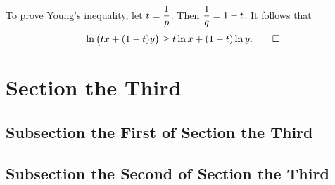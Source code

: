To prove Young's inequality, let \(\displaystyle t = \frac{1}{p}\). Then \(\displaystyle
\frac{1}{q} = 1 - t\). It follows that
\[
    \ln \big(t x + (1 - t) y \big) \ge t \ln x + (1 - t) \ln y. \qedhere
\]
\Epr

\section{Section the Third}

\kant[21-22]

\Bxr[Euler]
\kant[23]
\Exr

\kant[24-25]

\subsection{Subsection the First of Section the Third}

\kant[26-27]

\Bpr
\kant[28]
\Epr

\kant[29-30]

\subsection{Subsection the Second of Section the Third}

\kant[31-32]

\Bsl[Riemann]
\kant[33]
\Esl

\kant[34-35]

\Edc
